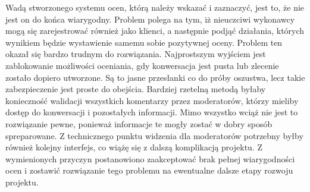 Wadą stworzonego systemu ocen, którą należy wskazać i zaznaczyć, jest to, że nie jest on do końca wiarygodny. Problem polega na tym, iż nieuczciwi wykonawcy mogą się zarejestrować również jako klienci, a następnie podjąć działania, których wynikiem będzie wystawienie samemu sobie pozytywnej oceny. Problem ten okazał się bardzo trudnym do rozwiązania. Najprostszym wyjściem jest zablokowanie możliwości oceniania, gdy konwersacja jest pusta lub zlecenie zostało dopiero utworzone. Są to jasne przesłanki co do próby oszustwa, lecz takie zabezpieczenie jest proste do obejścia. Bardziej rzetelną metodą byłaby konieczność walidacji wszystkich komentarzy przez moderatorów, którzy mieliby dostęp do konwersacji i pozostałych informacji. Mimo wszystko wciąż nie jest to rozwiązanie pewne, ponieważ informacje te mogły zostać w dobry sposób spreparowane. Z technicznego punktu widzenia dla moderatorów potrzebny byłby również kolejny interfejs, co wiążę się z dalszą komplikacją projektu. Z wymienionych przyczyn postanowiono zaakceptować brak pełnej wiarygodności ocen i zostawić rozwiązanie tego problemu na ewentualne dalsze etapy rozwoju projektu.